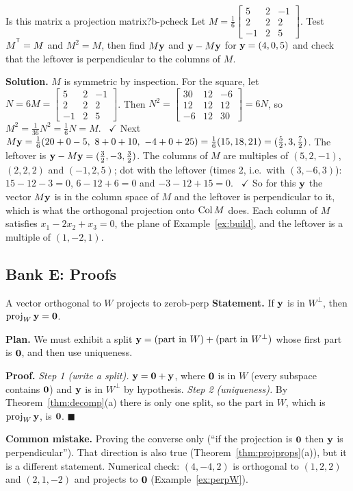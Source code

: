 \documentclass[11pt]{article}
\begin{document}
\begin{exmp}{Is this matrix a projection matrix?}{b-pcheck}
Let $M=\tfrac16\begin{bmatrix}5&2&-1\\2&2&2\\-1&2&5\end{bmatrix}$. Test $M^{^{\mathsf T}}=M$ and $M^2=M$, then find $M\mathbf{y}$ and $\mathbf{y}-M\mathbf{y}$ for $\mathbf{y}=(4,0,5)$ and check that the leftover is perpendicular to the columns of $M$.

\textbf{Solution.} $M$ is symmetric by inspection. For the square, let $N=6M=\begin{bmatrix}5&2&-1\\2&2&2\\-1&2&5\end{bmatrix}$. Then $N^2=\begin{bmatrix}30&12&-6\\12&12&12\\-6&12&30\end{bmatrix}=6N$, so $M^2=\tfrac1{36}N^2=\tfrac16N=M$. \ $\checkmark$ Next $M\bv{y}=\tfrac16(20+0-5,\ 8+0+10,\ -4+0+25)=\tfrac16(15,18,21)=(\tfrac52,3,\tfrac72)$. The leftover is $\mathbf{y}-M\mathbf{y}=(\tfrac32,-3,\tfrac32)$. The columns of $M$ are multiples of $(5,2,-1)$, $(2,2,2)$ and $(-1,2,5)$; dot with the leftover (times $2$, i.e.\ with $(3,-6,3)$): $15-12-3=0$, $6-12+6=0$ and $-3-12+15=0$. \ $\checkmark$ So for this $\mathbf{y}$ the vector $M\mathbf{y}$ is in the column space of $M$ and the leftover is perpendicular to it, which is what the orthogonal projection onto $\operatorname{Col} M$ does. Each column of $M$ satisfies $x_1-2x_2+x_3=0$, the plane of Example~\ref{ex:build}, and the leftover is a multiple of $(1,-2,1)$.
\end{exmp}

\subsection*{Bank E: Proofs}
\begin{exmp}{A vector orthogonal to $W$ projects to zero}{b-perp}
\textbf{Statement.} If $\mathbf{y}$ is in $W^{\perp}$, then $\operatorname{proj}_W\mathbf{y}=\mathbf{0}$.

\textbf{Plan.} We must exhibit a split $\mathbf{y}=(\text{part in }W)+(\text{part in }W^{\perp})$ whose first part is $\mathbf{0}$, and then use uniqueness.

\textbf{Proof.}
\emph{Step 1 (write a split).} $\mathbf{y}=\mathbf{0}+\mathbf{y}$, where $\mathbf{0}$ is in $W$ (every subspace contains $\mathbf{0}$) and $\mathbf{y}$ is in $W^{\perp}$ by hypothesis.
\emph{Step 2 (uniqueness).} By Theorem~\ref{thm:decomp}(a) there is only one split, so the part in $W$, which is $\operatorname{proj}_W\mathbf{y}$, is $\mathbf{0}$. \qquad$\blacksquare$

\textbf{Common mistake.} Proving the converse only (``if the projection is $\mathbf{0}$ then $\mathbf{y}$ is perpendicular''). That direction is also true (Theorem~\ref{thm:projprops}(a)), but it is a different statement. Numerical check: $(4,-4,2)$ is orthogonal to $(1,2,2)$ and $(2,1,-2)$ and projects to $\mathbf{0}$ (Example~\ref{ex:perpW}).
\end{exmp}
\end{document}
